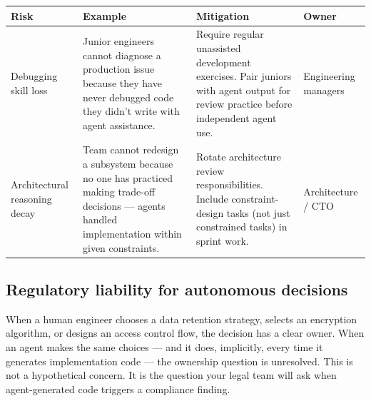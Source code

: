 \documentclass[
  a4paper,
  DIV=11,
  numbers=noendperiod]{scrreprt}
\newcounter{none} %
\begin{document}
{\def\LTcaptype{none} %
\begin{longtable}[]{@{}
  >{\raggedright\arraybackslash}p{}
  >{\raggedright\arraybackslash}p{}
  >{\raggedright\arraybackslash}p{}
  >{\raggedright\arraybackslash}p{}@{}}
\toprule\noalign{}
\begin{minipage}[b]{\linewidth}\raggedright
Risk
\end{minipage} & \begin{minipage}[b]{\linewidth}\raggedright
Example
\end{minipage} & \begin{minipage}[b]{\linewidth}\raggedright
Mitigation
\end{minipage} & \begin{minipage}[b]{\linewidth}\raggedright
Owner
\end{minipage} \\
\midrule\noalign{}
\endhead
\bottomrule\noalign{}
\endlastfoot
Debugging skill loss & Junior engineers cannot diagnose a production
issue because they have never debugged code they didn't write with agent
assistance. & Require regular unassisted development exercises. Pair
juniors with agent output for review practice before independent agent
use. & Engineering managers \\
Architectural reasoning decay & Team cannot redesign a subsystem because
no one has practiced making trade-off decisions --- agents handled
implementation within given constraints. & Rotate architecture review
responsibilities. Include constraint-design tasks (not just constrained
tasks) in sprint work. & Architecture / CTO \\
\end{longtable}
}

\subsection{Regulatory liability for autonomous
decisions}\label{regulatory-liability-for-autonomous-decisions}

When a human engineer chooses a data retention strategy, selects an
encryption algorithm, or designs an access control flow, the decision
has a clear owner. When an agent makes the same choices --- and it does,
implicitly, every time it generates implementation code --- the
ownership question is unresolved. This is not a hypothetical concern. It
is the question your legal team will ask when agent-generated code
triggers a compliance finding.
\end{document}
